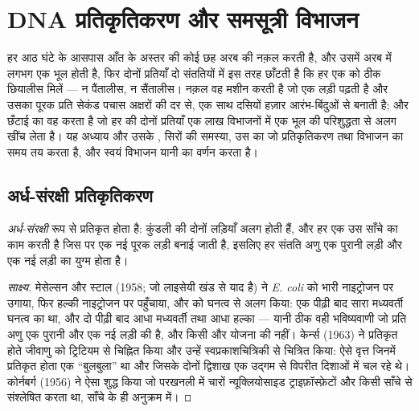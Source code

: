 \chapter{DNA प्रतिकृतिकरण और समसूत्री विभाजन}\label{ch:b1:replication-mitosis}

हर आठ घंटे के आसपास आँत के अस्तर की कोई  छह अरब  की
नक़ल करती है, और उसमें अरब में लगभग एक भूल होती है, फिर दोनों प्रतियाँ दो
संततियों में इस तरह छाँटती है कि हर एक को ठीक छियालीस  मिलें ---
न पैंतालीस, न सैंतालीस। नक़ल वह मशीन करती है जो एक लड़ी पढ़ती है और उसका
पूरक प्रति सेकंड पचास अक्षरों की दर से, एक साथ दसियों हज़ार आरंभ-बिंदुओं
से बनाती है; और छँटाई  का वह  करता है जो हर 
की दोनों प्रतियाँ एक लाख विभाजनों में एक भूल की परिशुद्धता से अलग खींच
लेता है। यह अध्याय  और उसके , सिरों की
समस्या, उस  का जो प्रतिकृतिकरण तथा विभाजन का समय तय करता है,
और स्वयं विभाजन यानी  का वर्णन करता है।

\section{अर्ध-संरक्षी प्रतिकृतिकरण}

\begin{proposition}[हर लड़ी एक साँचा है]\label{prop:b1:replication-mitosis:semiconservative}
 \emph{अर्ध-संरक्षी} रूप से प्रतिकृत होता है: कुंडली की दोनों लड़ियाँ
अलग होती हैं, और हर एक उस साँचे का काम करती है जिस पर एक नई पूरक लड़ी
बनाई जाती है, इसलिए हर संतति अणु एक पुरानी लड़ी और एक नई लड़ी का युग्म
होता है।
\end{proposition}
\begin{proof}[साक्ष्य]
मेसेल्सन और स्टाल (1958; जो लाइसेयी खंड से याद है) ने
\emph{E. coli} को भारी नाइट्रोजन पर उगाया, फिर हल्की नाइट्रोजन पर
पहुँचाया, और  को घनत्व से अलग किया: एक पीढ़ी बाद सारा 
मध्यवर्ती घनत्व का था, और दो पीढ़ी बाद आधा मध्यवर्ती तथा आधा हल्का ---
यानी ठीक वही भविष्यवाणी जो प्रति अणु एक पुरानी और एक नई लड़ी की है, और
किसी और योजना की नहीं। केर्न्स (1963) ने प्रतिकृत होते जीवाणु 
को ट्रिटियम से चिह्नित किया और उन्हें स्वप्रकाशचित्रिकी से चित्रित किया:
ऐसे वृत्त जिनमें प्रतिकृत होता एक ``बुलबुला'' था और जिसके दोनों द्विशाख
एक उद्गम से विपरीत दिशाओं में चल रहे थे। कोर्नबर्ग (1956) ने ऐसा 
शुद्ध किया जो परखनली में चारों न्यूक्लियोसाइड ट्राइफ़ॉस्फ़ेटों और किसी
साँचे से  संश्लेषित करता था, साँचे के ही अनुक्रम में।
\end{proof}

